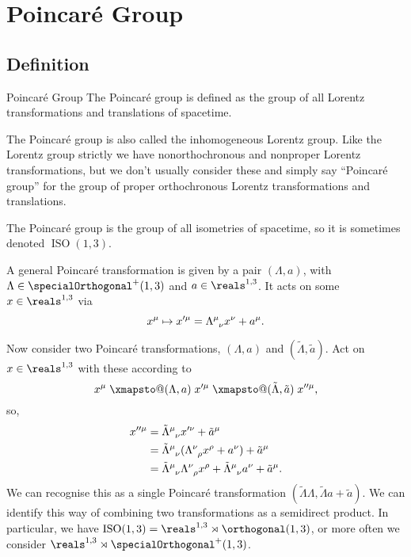 \documentclass[fleqn]{NotesClass}
\makeatletter
\newcommand{\minkowskiSpace}{\reals^{1,3}}
\renewcommand{\xmapsto}[2][]{\mathrel{\mathpalette\xmapsto@{{#1}{#2}}}}
\newcommand{\xmapsto@}[2]{\xmapsto@@{#1}#2}
\newcommand{\xmapsto@@}[3]{%
    \begingroup
    \sbox\z@{$\m@th#1\mathop{}\limits_{\;#2\;}^{\;#3\;}$}%
    \mathop{\Uhextensible width \wd\z@ 0 "27FC}_{#2}^{#3}%
    \endgroup
}
\DeclareMathOperator{\ISO}{ISO}
\makeatother
\begin{document}
    \chapter{Poincar\'e Group}
    \section{Definition}
    \begin{dfn}{Poincar\'e Group}{}
        The Poincar\'e group is defined as the group of all Lorentz transformations and translations of spacetime.
    \end{dfn}
    
    The Poincar\'e group is also called the inhomogeneous Lorentz group.
    Like the Lorentz group strictly we have nonorthochronous and nonproper Lorentz transformations, but we don't usually consider these and simply say \enquote{Poincar\'e group} for the group of proper orthochronous Lorentz transformations and translations.
    
    The Poincar\'e group is the group of all isometries of spacetime, so it is sometimes denoted \(\ISO(1, 3)\).
    
    A general Poincar\'e transformation is given by a pair \((\Lambda, a)\), with \(\Lambda \in \specialOrthogonal^+(1, 3)\) and \(a \in \minkowskiSpace\).
    It acts on some \(x \in \minkowskiSpace\) via
    \begin{equation}
        x^\mu \mapsto x'^\mu = \tensor{\Lambda}{^\mu_\nu} x^\nu + a^\mu.
    \end{equation}
    
    Now consider two Poincar\'e transformations, \((\Lambda, a)\) and \((\tilde{\Lambda}, \tilde{a})\).
    Act on \(x \in \minkowskiSpace\) with these according to
    \begin{equation}
        x^\mu \xmapsto{(\Lambda, a)} x'^\mu \xmapsto{(\tilde{\Lambda}, \tilde{a})} x''^\mu,
    \end{equation}
    so,
    \begin{align}
        x''^\mu &= \tensor{\tilde{\Lambda}}{^\mu_\nu}x'^\nu + \tilde{a}^\mu\\
        &= \tensor{\tilde{\Lambda}}{^\mu_\nu} (\tensor{\Lambda}{^\nu_\rho} x^\rho + a^\nu) + \tilde{a}^\mu\\
        &= \tensor{\tilde{\Lambda}}{^\mu_\nu} \tensor{\Lambda}{^\nu_\rho} x^\rho + \tensor{\tilde{\Lambda}}{^\mu_\nu}a^\nu + \tilde{a}^\mu.
    \end{align}
    We can recognise this as a single Poincar\'e transformation \((\tilde{\Lambda}\Lambda, \tilde{\Lambda}a + \tilde{a})\).
    We can identify this way of combining two transformations as a semidirect product.
    In particular, we have \(\ISO(1, 3) = \minkowskiSpace \rtimes \orthogonal(1, 3)\), or more often we consider \(\minkowskiSpace \rtimes \specialOrthogonal^+(1, 3)\).
    
    
    
    
    \backmatter
    \printindex
\end{document}
